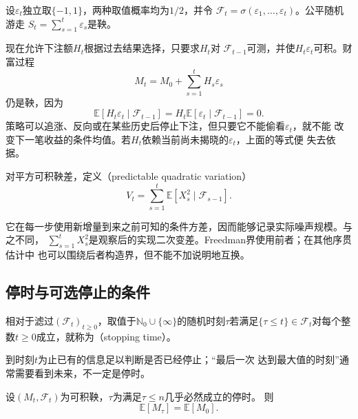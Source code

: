 \begin{example}[公平随机游走与按过去下注]
  \label{ex:stoch-predictable-betting}
  设$\varepsilon_t$独立取$\{-1,1\}$，两种取值概率均为$1/2$，并令
  $\mathcal{F}_t=\sigma(\varepsilon_1,\ldots,\varepsilon_t)$。公平随机游走
  $S_t=\sum_{s=1}^{t}\varepsilon_s$是鞅。

  现在允许下注额$H_t$根据过去结果选择，只要求$H_t$对
  $\mathcal{F}_{t-1}$可测，并使$H_t\varepsilon_t$可积。财富过程
  \[
    M_t=M_0+\sum_{s=1}^{t}H_s\varepsilon_s
  \]
  仍是鞅，因为
  \[
    \mathbb{E}[H_t\varepsilon_t\mid\mathcal{F}_{t-1}]
    =
    H_t\mathbb{E}[\varepsilon_t\mid\mathcal{F}_{t-1}]
    =0.
  \]
  策略可以追涨、反向或在某些历史后停止下注，但只要它不能偷看$\varepsilon_t$，就不能
  改变下一笔收益的条件均值。若$H_t$依赖当前尚未揭晓的$\varepsilon_t$，上面的等式便
  失去依据。
\end{example}

\begin{definition}[可预测二次变差]
  \label{def:stoch-predictable-quadratic-variation}
对平方可积鞅差，定义（predictable quadratic variation）
\begin{equation}
  V_t=\sum_{s=1}^{t}\mathbb{E}[X_s^2\mid\mathcal{F}_{s-1}].
  \label{eq:stoch-predictable-quadratic-variation}
\end{equation}
\end{definition}
它在每一步使用新增量到来之前可知的条件方差，因而能够记录实际噪声规模。与之不同，
$\sum_{s=1}^{t}X_s^2$是观察后的实现二次变差。Freedman界使用前者；在其他序贯估计中
也可以围绕后者构造界，但不能不加说明地互换。

\subsection{停时与可选停止的条件}

\begin{definition}[停时]
  \label{def:stoch-stopping-time}
  相对于滤过\((\mathcal F_t)_{t\geq0}\)，取值于\(\mathbb N_0\cup\{\infty\}\)的随机时刻$\tau$若满足$\{\tau\leq t\}\in\mathcal{F}_t$对每个整数$t\geq0$成立，就称为（stopping time）。
\end{definition}
到时刻$t$为止已有的信息足以判断是否已经停止；“最后一次
达到最大值的时刻”通常需要看到未来，不一定是停时。

\begin{theorem}[有界停时的可选停止]
  \label{thm:stoch-bounded-optional-stopping}
  设$(M_t,\mathcal{F}_t)$为可积鞅，$\tau$为满足$\tau\leq n$几乎必然成立的停时。
  则
  \[
    \mathbb{E}[M_\tau]=\mathbb{E}[M_0].
  \]
\end{theorem}

